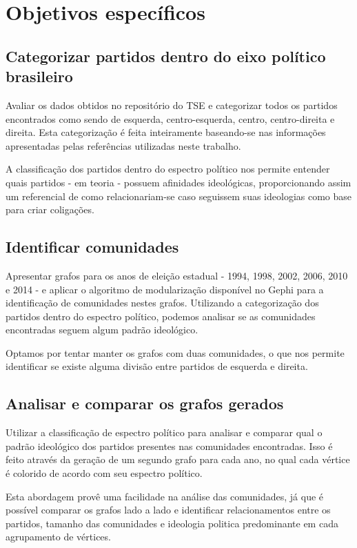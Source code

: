 \section{Objetivos específicos}
\label{proposta__objetivos-especificos}

\subsection{Categorizar partidos dentro do eixo político brasileiro}
\label{proposta__objetivos-especificos--categorizacao}

Avaliar os dados obtidos no repositório do \gls{TSE} e categorizar todos os partidos encontrados como sendo de esquerda, centro-esquerda, centro, centro-direita e direita. Esta categorização é feita inteiramente baseando-se nas informações apresentadas pelas referências utilizadas neste trabalho.

A classificação dos partidos dentro do espectro político nos permite entender quais partidos - em teoria - possuem afinidades ideológicas, proporcionando assim um referencial de como relacionariam-se caso seguissem suas ideologias como base para criar coligações. 

\subsection{Identificar comunidades}
\label{proposta__objetivos-especificos--identificacao-comunidades}

Apresentar grafos para os anos de eleição estadual - 1994, 1998, 2002, 2006, 2010 e 2014 - e aplicar o algoritmo de modularização disponível no Gephi para a identificação de comunidades nestes grafos. Utilizando a categorização dos partidos dentro do espectro político, podemos analisar se as comunidades encontradas seguem algum padrão ideológico.

Optamos por tentar manter os grafos com duas comunidades, o que nos permite identificar se existe alguma divisão entre partidos de esquerda e direita.  

\subsection{Analisar e comparar os grafos gerados}
\label{proposta__objetivos-especificos--analise-comparacao}

Utilizar a classificação de espectro político para analisar e comparar qual o padrão ideológico dos partidos presentes nas comunidades encontradas. Isso é feito através da geração de um segundo grafo para cada ano, no qual cada vértice é colorido de acordo com seu espectro político. 

Esta abordagem provê uma facilidade na análise das comunidades, já que é possível comparar os grafos lado a lado e identificar relacionamentos entre os partidos, tamanho das comunidades e ideologia politica predominante em cada agrupamento de vértices.

 